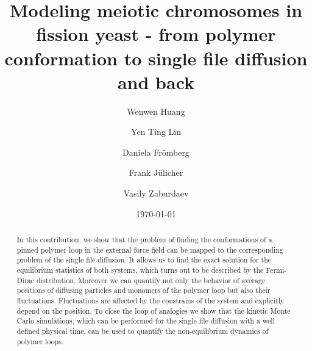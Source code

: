 \documentclass[preprint, aps, superscriptaddress]{revtex4-1}
\begin{document}
\title{Modeling meiotic chromosomes in fission yeast - from polymer conformation to single file diffusion and back}

\author{Wenwen Huang}
\author{Yen Ting Lin}
\author{Daniela Fr\"{o}mberg}
\author{Frank J\"{u}licher}
\author{Vasily Zaburdaev}

\date{\today}

\begin{abstract}
In this contribution, we show that the problem of finding the conformations of a
pinned polymer loop in the external force field can be mapped to the
corresponding problem of the single file diffusion. It allows us to find the
exact solution for the equilibrium statistics of both systems, which turns out
to be described by the Fermi-Dirac distribution. Moreover we can quantify not
only the behavior of average positions of diffusing particles and monomers of
the polymer loop but also their fluctuations. Fluctuations are affected by the
constrains of the system and explicitly depend on the position. To close the
loop of analogies we show that the kinetic Monte Carlo simulations, which can be
performed for the single file diffusion with a well defined physical time, can
be used to quantify the non-equilibrium dynamics of polymer loops.


\end{abstract}
\maketitle
\end{document}
